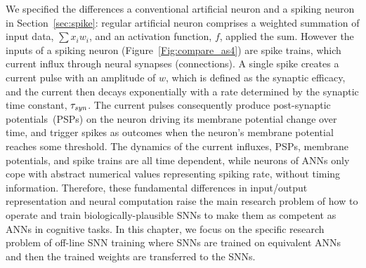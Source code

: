 	We \DIFdelbegin {}\DIFdelend specified the differences \DIFdelbegin {}\DIFdelend \DIFaddbegin {}\DIFaddend a conventional artificial neuron and a spiking neuron in Section~\ref{sec:spike}: \DIFaddbegin {}\DIFaddend regular artificial neuron comprises a weighted summation of input data, $\sum x_i w_i$, and an activation function, $f$, applied \DIFdelbegin {}\DIFdelend \DIFaddbegin {}\DIFaddend the sum.
	However the inputs of a spiking neuron (Figure~\ref{Fig:compare_as4}) are spike trains, which \DIFdelbegin {}\DIFdelend \DIFaddbegin {}\DIFaddend current influx through neural synapses (connections).
	A single spike creates a current pulse with an amplitude of $w$, which is defined as the synaptic efficacy, and the current then decays exponentially with a \DIFdelbegin {}\DIFdelend \DIFaddbegin {}\DIFaddend rate determined by the synaptic time constant, $\tau_{\textit{\textrm{syn}}}$.
	The current pulses \DIFdelbegin {}\DIFdelend consequently produce post-synaptic potentials~(PSPs) on the neuron driving its membrane potential \DIFaddbegin {}\DIFaddend change over time, and trigger spikes as outcomes when the neuron's membrane potential reaches some threshold.
	The dynamics of the current influxes, PSPs, membrane potentials, and spike trains are all time dependent, while \DIFaddbegin {}\DIFaddend neurons of ANNs only cope with abstract numerical values representing spiking rate, without timing information.
	Therefore, these fundamental differences in input/output representation and neural computation raise the main research problem of how to operate and train biologically-plausible SNNs to make them as competent as ANNs in cognitive tasks.
	In this chapter, we focus on the specific research problem of off-line SNN training where SNNs are trained on equivalent ANNs and then the trained weights are transferred to the SNNs.


